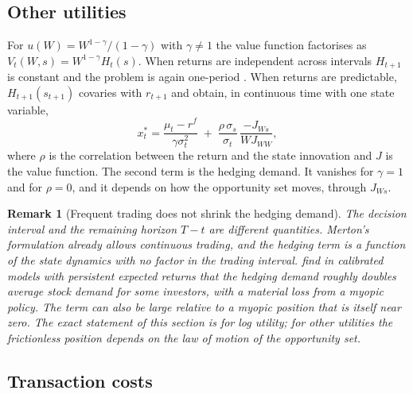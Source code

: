 \documentclass[11pt]{article}
\newtheorem{remark}{Remark}
\begin{document}
\subsection{Other utilities}

For $u(W) = W^{1-\gamma}/(1-\gamma)$ with $\gamma \ne 1$ the value function factorises as $V_t(W, s) = W^{1-\gamma} H_t(s)$. When returns are independent across intervals $H_{t+1}$ is constant and the problem is again one-period \citep{samuelson1969}. When returns are predictable, $H_{t+1}(s_{t+1})$ covaries with $r_{t+1}$ and \citet{merton1971,merton1973} obtain, in continuous time with one state variable,
\[
x_t^\ast = \frac{\mu_t - r^f}{\gamma \sigma_t^2} \;+\; \frac{\rho\, \sigma_{s}}{\sigma_t}\,\frac{-J_{Ws}}{W J_{WW}},
\]
where $\rho$ is the correlation between the return and the state innovation and $J$ is the value function. The second term is the hedging demand. It vanishes for $\gamma = 1$ and for $\rho = 0$, and it depends on how the opportunity set moves, through $J_{Ws}$.

\begin{remark}[Frequent trading does not shrink the hedging demand]
The decision interval and the remaining horizon $T - t$ are different quantities. Merton's formulation already allows continuous trading, and the hedging term is a function of the state dynamics with no factor in the trading interval. \citet{campbell1999} find in calibrated models with persistent expected returns that the hedging demand roughly doubles average stock demand for some investors, with a material loss from a myopic policy. The term can also be large relative to a myopic position that is itself near zero. The exact statement of this section is for log utility; for other utilities the frictionless position depends on the law of motion of the opportunity set.
\end{remark}

\subsection{Transaction costs}
\end{document}
